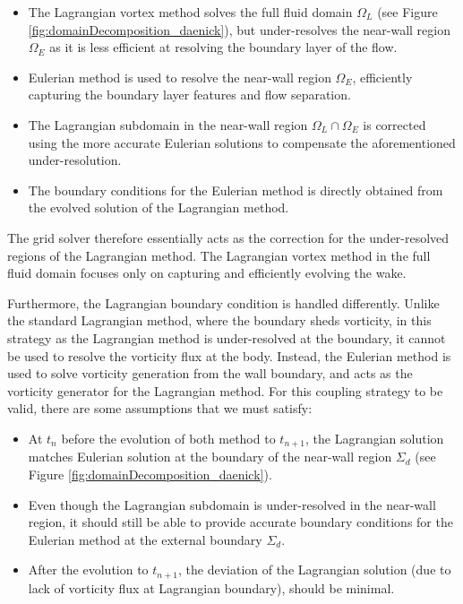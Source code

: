 	\begin{itemize}
	\item The Lagrangian vortex method solves the full fluid domain $\Omega_L$ (see Figure \ref{fig:domainDecomposition_daenick}), but under-resolves the near-wall region $\Omega_E$ as it is less efficient at resolving the boundary layer of the flow.
	
	\item Eulerian method is used to resolve the near-wall region $\Omega_E$, efficiently capturing the boundary layer features and flow separation.
	
	\item The Lagrangian subdomain in the near-wall region $\Omega_L\cap\Omega_E$ is corrected using the more accurate Eulerian solutions to compensate the aforementioned under-resolution.
	
	\item The boundary conditions for the Eulerian method is directly obtained from the evolved solution of the Lagrangian method.
	\end{itemize}
	
	The grid solver therefore essentially acts as the correction for the under-resolved regions of the Lagrangian method. The Lagrangian vortex method in the full fluid domain focuses only on capturing and efficiently evolving the wake.
	
	Furthermore, the Lagrangian boundary condition is handled differently. Unlike the standard Lagrangian method, where the boundary sheds vorticity, in this strategy as the Lagrangian method is under-resolved at the boundary, it cannot be used to resolve the vorticity flux at the body. Instead, the Eulerian method is used to solve vorticity generation from the wall boundary, and acts as the vorticity generator for the Lagrangian method. For this coupling strategy to be valid, there are some assumptions that we must satisfy:

	\begin{itemize}
	\item At $t_n$ before the evolution of both method to $t_{n+1}$, the Lagrangian solution matches Eulerian solution at the boundary of the near-wall region $\Sigma_d$ (see Figure \ref{fig:domainDecomposition_daenick}).
	\item Even though the Lagrangian subdomain is under-resolved in the near-wall region, it should still be able to provide accurate boundary conditions for the Eulerian method at the external boundary $\Sigma_d$.
	\item After the evolution to $t_{n+1}$, the deviation of the Lagrangian solution (due to lack of vorticity flux at Lagrangian boundary), should be minimal.
	\end{itemize}	
	

